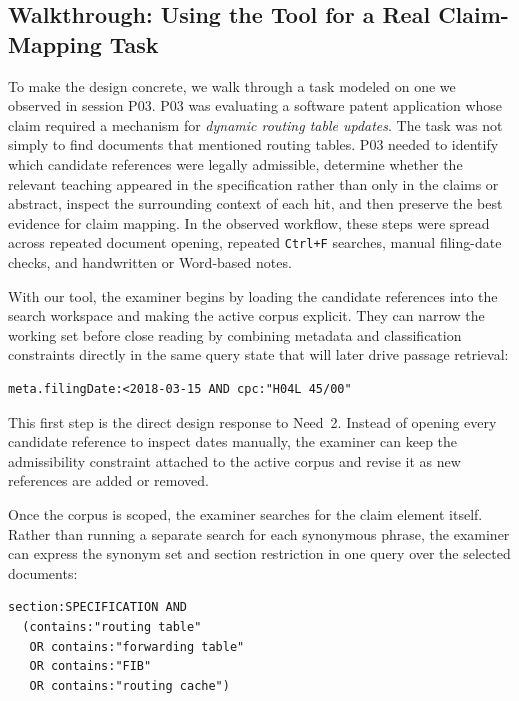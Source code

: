 \documentclass[sigconf]{acmart}
\begin{document}
\subsection{Walkthrough: Using the Tool for a Real Claim-Mapping Task}

To make the design concrete, we walk through a task modeled on one we observed
in session P03. P03 was evaluating a software patent application whose claim
required a mechanism for \emph{dynamic routing table updates}. The task was not
simply to find documents that mentioned routing tables. P03 needed to identify
which candidate references were legally admissible, determine whether the
relevant teaching appeared in the specification rather than only in the claims
or abstract, inspect the surrounding context of each hit, and then preserve the
best evidence for claim mapping. In the observed workflow, these steps were
spread across repeated document opening, repeated \texttt{Ctrl+F} searches,
manual filing-date checks, and handwritten or Word-based notes.

With our tool, the examiner begins by loading the candidate references into the
search workspace and making the active corpus explicit. They can narrow the
working set before close reading by combining metadata and classification
constraints directly in the same query state that will later drive passage
retrieval:

\begin{lstlisting}[caption={Scoping a legally admissible technical slice before close reading.}]
meta.filingDate:<2018-03-15 AND cpc:"H04L 45/00"
\end{lstlisting}

This first step is the direct design response to Need~2. Instead of opening
every candidate reference to inspect dates manually, the examiner can keep the
admissibility constraint attached to the active corpus and revise it as new
references are added or removed.

Once the corpus is scoped, the examiner searches for the claim element itself.
Rather than running a separate search for each synonymous phrase, the examiner
can express the synonym set and section restriction in one query over the
selected documents:

\begin{lstlisting}[caption={Passage-level query for a claim element across a scoped corpus.}]
section:SPECIFICATION AND
  (contains:"routing table"
   OR contains:"forwarding table"
   OR contains:"FIB"
   OR contains:"routing cache")
\end{lstlisting}
\end{document}
